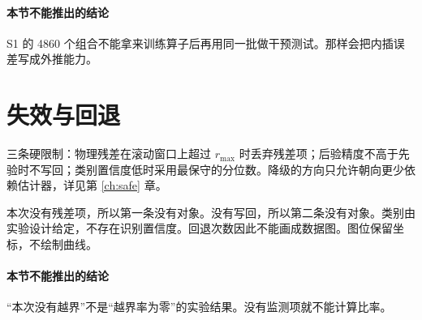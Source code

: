 \paragraph{本节不能推出的结论}
S1 的 4860 个组合不能拿来训练算子后再用同一批做干预测试。那样会把内插误差写成外推能力。

\section{失效与回退}

三条硬限制：物理残差在滚动窗口上超过 \(r_{\max}\) 时丢弃残差项；后验精度不高于先验时不写回；类别置信度低时采用最保守的分位数。降级的方向只允许朝向更少依赖估计器，详见第 \ref{ch:safe} 章。

本次没有残差项，所以第一条没有对象。没有写回，所以第二条没有对象。类别由实验设计给定，不存在识别置信度。回退次数因此不能画成数据图。图位保留坐标，不绘制曲线。

\paragraph{本节不能推出的结论}
“本次没有越界”不是“越界率为零”的实验结果。没有监测项就不能计算比率。
